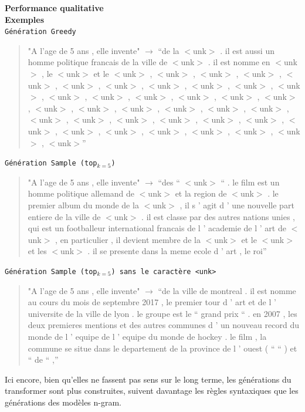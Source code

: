\noindent{}\textbf{Performance qualitative} \\

\textbf{Exemples} \\

\noindent{} \texttt{Génération Greedy}

\begin{quotation}
"A l'age de 5 ans , elle invente" $\rightarrow$  “de la $<$unk$>$ . il est aussi un homme politique francais de la ville de $<$unk$>$ . il est nomme en $<$unk$>$ , le $<$unk$>$ et le $<$unk$>$ , $<$unk$>$ , $<$unk$>$ , $<$unk$>$ , $<$unk$>$ , $<$unk$>$ , $<$unk$>$ , $<$unk$>$ , $<$unk$>$ , $<$unk$>$ , $<$unk$>$ , $<$unk$>$ , $<$unk$>$ , $<$unk$>$ , $<$unk$>$ , $<$unk$>$ , $<$unk$>$ , $<$unk$>$ , $<$unk$>$ , $<$unk$>$ , $<$unk$>$ , $<$unk$>$ , $<$unk$>$ , $<$unk$>$ , $<$unk$>$ , $<$unk$>$ , $<$unk$>$ , $<$unk$>$ , $<$unk$>$ , $<$unk$>$ , $<$unk$>$ , $<$unk$>$ , $<$unk$>$ , $<$unk$>$ , $<$unk$>$ , $<$unk$>$ , $<$unk$>$”
\end{quotation}

\vspace{0.4cm}

\noindent{} \texttt{Génération Sample (top$_{k=5}$)}  \\

\begin{quotation}
"A l'age de 5 ans , elle invente" $\rightarrow$ “des `` $<$unk$>$ `` . le film est un homme politique allemand de $<$unk$>$ et la region de $<$unk$>$ . le premier album du monde de la $<$unk$>$ , il s ' agit d ' une nouvelle part entiere de la ville de $<$unk$>$ . il est classe par des autres nations unies , qui est un footballeur international francais de l ' academie de l ' art de $<$unk$>$ , en particulier , il devient membre de la $<$unk$>$ et le $<$unk$>$ et les $<$unk$>$ . il se presente dans la meme ecole d ' art , le roi”
\end{quotation}

\vspace{0.4cm}

\noindent{} \texttt{Génération Sample (top$_{k=5}$) sans le caractère <unk>}  \\

\begin{quotation}
"A l'age de 5 ans , elle invente" $\rightarrow$ “de la ville de montreal . il est nomme au cours du mois de septembre 2017 , le premier tour d ' art et de l ' universite de la ville de lyon . le groupe est le `` grand prix `` . en 2007 , les deux premieres mentions et des autres communes d ' un nouveau record du monde de l ' equipe de l ' equipe du monde de hockey . le film , la commune se situe dans le departement de la province de l ' ouest ( `` `` ) et `` de `` ,”
\end{quotation}

Ici encore, bien qu'elles ne fassent pas sens sur le long terme, les générations du transformer sont plus construites, suivent davantage les règles syntaxiques que les générations des modèles n-gram.







